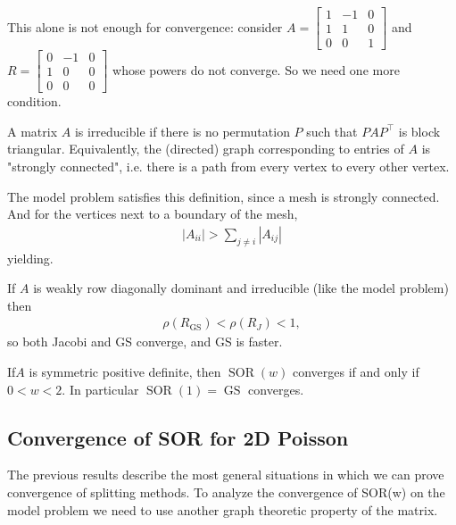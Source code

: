 \documentclass[11pt]{article}
\numberwithin{equation}{section}
\begin{document}
This alone is not enough for convergence: consider $A=\left[\begin{array}{lll}
    1 & -1 & 0 \\
    1 & 1 & 0 \\
    0 & 0 & 1
    \end{array}\right]$ and $R=\left[\begin{array}{ccc}
        0 & -1 & 0 \\
        1 & 0 & 0 \\
        0 & 0 & 0
        \end{array}\right]$ whose powers do not converge. So we need one more condition.

\begin{definition}
    A matrix $A$ is irreducible if there is no permutation $P$ such that $PAP^\top$ is block triangular. 
    Equivalently, the (directed) graph corresponding to entries of $A$ is "strongly connected", i.e. there is a path from every vertex to every other vertex.
\end{definition}

The model problem satisfies this definition, since a mesh is strongly connected. And for the vertices next to a boundary of the mesh,\begin{align*}
    |A_{ii}| > \sum_{j \neq i} |A_{ij}|
\end{align*}
yielding.

\begin{theorem}
    If $A$ is weakly row diagonally dominant and irreducible (like the model problem) then \begin{align*}
        \rho(R_{\operatorname{GS}}) < \rho(R_J) < 1,
    \end{align*}so both Jacobi and GS converge, and GS is faster.
\end{theorem}

\begin{theorem}
    If$ A$ is symmetric positive definite, then $\operatorname{SOR}(w)$ converges if and only if $0 < w < 2$. 
    In particular $\operatorname{SOR}(1) = \operatorname{GS}$ converges.
\end{theorem}

\subsection{Convergence of SOR for 2D Poisson}
The previous results describe the most general situations in which we can prove convergence of splitting methods.
To analyze the convergence of SOR(w) on the model problem we need to use another graph theoretic property of the matrix.
\end{document}
